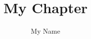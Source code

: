 \documentclass[journal,a4paper,10pt]{../setup/IEEEtran}
\begin{document}
\def\localpath{.}
  
\title{My Chapter}
\author{My Name}
%
\maketitle
 
\begin{abstract}

\end{abstract}





 

 
\end{document}
